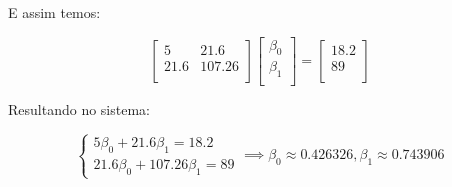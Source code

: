 \documentclass[11pt]{article}
\begin{document}
\begin{exerc}
\begin{enumerate}[a.]
E assim temos:

$$
\begin{bmatrix}
	5 & 21.6\\
	21.6 & 107.26\\
\end{bmatrix}
\begin{bmatrix}
	\beta_0\\
	\beta_1\\
\end{bmatrix}
=
\begin{bmatrix}
	18.2\\
	89\\
\end{bmatrix}
$$

Resultando no sistema:

$$
\begin{cases}
5\beta_0 + 21.6\beta_1 = 18.2\\
21.6\beta_0 + 107.26\beta_1 = 89
\end{cases}
\implies
\beta_0 \approx 0.426326, \beta_1 \approx 0.743906 
$$

\end{enumerate}
\end{exerc}
\end{document}
